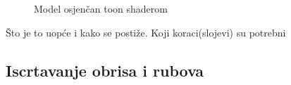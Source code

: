 \begin{figure}[H]
\label{fig:monkey-toonshaded}
\begin{center}
\caption{Model osjenčan toon shaderom}
\end{center}
\end{figure}

Što je to uopće i kako se postiže. Koji koraci(slojevi) su potrebni

\subsection{Iscrtavanje obrisa i rubova}

